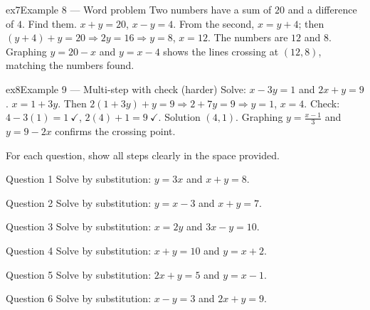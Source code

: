 \documentclass[11pt]{article}
\begin{document}
\begin{example}{ex7}{Example 8 --- Word problem}
Two numbers have a sum of $20$ and a difference of $4$. Find them.
\soln $x+y=20$, $x-y=4$. From the second, $x=y+4$; then $(y+4)+y=20\Rightarrow 2y=16\Rightarrow y=8$, $x=12$. The numbers are $12$ and $8$. Graphing $y=20-x$ and $y=x-4$ shows the lines crossing at $(12,8)$, matching the numbers found.
\end{example}

\begin{example}{ex8}{Example 9 --- Multi-step with check (harder)}
Solve: $x-3y=1$ and $2x+y=9$.
\soln $x=1+3y$. Then $2(1+3y)+y=9\Rightarrow 2+7y=9\Rightarrow y=1$, $x=4$. Check: $4-3(1)=1\ \checkmark$, $2(4)+1=9\ \checkmark$. Solution $(4,1)$. Graphing $y=\tfrac{x-1}3$ and $y=9-2x$ confirms the crossing point.
\end{example}

\clearpage
{}
For each question, show all steps clearly in the space provided.

\begin{qbox}{Question 1}
Solve by substitution: $y=3x$ and $x+y=8$.\workspace{2.4cm}
\end{qbox}

\begin{qbox}{Question 2}
Solve by substitution: $y=x-3$ and $x+y=7$.\workspace{2.4cm}
\end{qbox}

\begin{qbox}{Question 3}
Solve by substitution: $x=2y$ and $3x-y=10$.\workspace{2.4cm}
\end{qbox}

\begin{qbox}{Question 4}
Solve by substitution: $x+y=10$ and $y=x+2$.\workspace{2.4cm}
\end{qbox}

\begin{qbox}{Question 5}
Solve by substitution: $2x+y=5$ and $y=x-1$.\workspace{2.4cm}
\end{qbox}

\begin{qbox}{Question 6}
Solve by substitution: $x-y=3$ and $2x+y=9$.\workspace{2.6cm}
\end{qbox}
\end{document}
